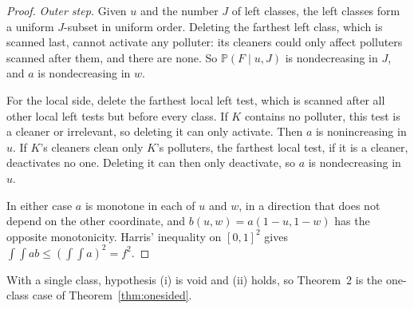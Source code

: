 \documentclass[11pt,a4paper]{article}
\theoremstyle{definition}\newtheorem{definition}[theorem]{Definition}
\theoremstyle{remark}\newtheorem{remark}[theorem]{Remark}
\newcommand{\Prb}{\mathbb P}
\theoremstyle{definition}\newtheorem{xexample}[xtheorem]{Example}\theoremstyle{plain}
\begin{document}
\begin{proof}
\emph{Outer step.} Given $u$ and the number $J$ of left classes, the left classes form a uniform $J$-subset in uniform order. Deleting the farthest left class, which is scanned last, cannot activate any polluter: its cleaners could only affect polluters scanned after them, and there are none. So $\Prb(F\mid u,J)$ is nondecreasing in $J$, and $a$ is nondecreasing in $w$.

For the local side, delete the farthest local left test, which is scanned after all other local left tests but before every class. If $K$ contains no polluter, this test is a cleaner or irrelevant, so deleting it can only activate. Then $a$ is nonincreasing in $u$. If $K$'s cleaners clean only $K$'s polluters, the farthest local test, if it is a cleaner, deactivates no one. Deleting it can then only deactivate, so $a$ is nondecreasing in $u$.

In either case $a$ is monotone in each of $u$ and $w$, in a direction that does not depend on the other coordinate, and $b(u,w)=a(1-u,1-w)$ has the opposite monotonicity. Harris' inequality on $[0,1]^2$ gives $\int\!\!\int ab\le(\int\!\!\int a)^2=f^2$.
\end{proof}
With a single class, hypothesis (i) is void and (ii) holds, so Theorem~2 is the one-class case of Theorem~\ref{thm:onesided}.
\end{document}
